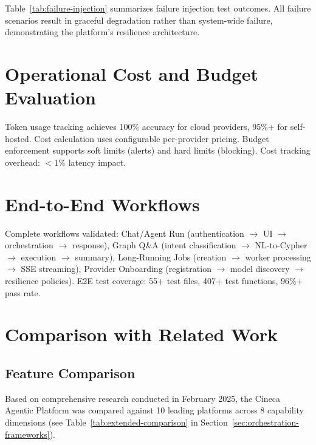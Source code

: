 \documentclass[a4paper,twoside]{sapthesis}
\begin{document}
Table~\ref{tab:failure-injection} summarizes failure injection test outcomes. All failure scenarios result in graceful degradation rather than system-wide failure, demonstrating the platform's resilience architecture.

\section{Operational Cost and Budget Evaluation}
\label{sec:cost-eval}

Token usage tracking achieves 100\% accuracy for cloud providers, 95\%+ for self-hosted. Cost calculation uses configurable per-provider pricing. Budget enforcement supports soft limits (alerts) and hard limits (blocking). Cost tracking overhead: $<$1\% latency impact.

\section{End-to-End Workflows}
\label{sec:e2e-workflows}

Complete workflows validated: Chat/Agent Run (authentication $\rightarrow$ UI $\rightarrow$ orchestration $\rightarrow$ response), Graph Q\&A (intent classification $\rightarrow$ NL-to-Cypher $\rightarrow$ execution $\rightarrow$ summary), Long-Running Jobs (creation $\rightarrow$ worker processing $\rightarrow$ SSE streaming), Provider Onboarding (registration $\rightarrow$ model discovery $\rightarrow$ resilience policies). E2E test coverage: 55+ test files, 407+ test functions, 96\%+ pass rate.

\section{Comparison with Related Work}
\label{sec:comparison}

\subsection{Feature Comparison}

Based on comprehensive research conducted in February 2025, the Cineca Agentic Platform was compared against 10 leading platforms across 8 capability dimensions (see Table~\ref{tab:extended-comparison} in Section~\ref{sec:orchestration-frameworks}).
\end{document}
